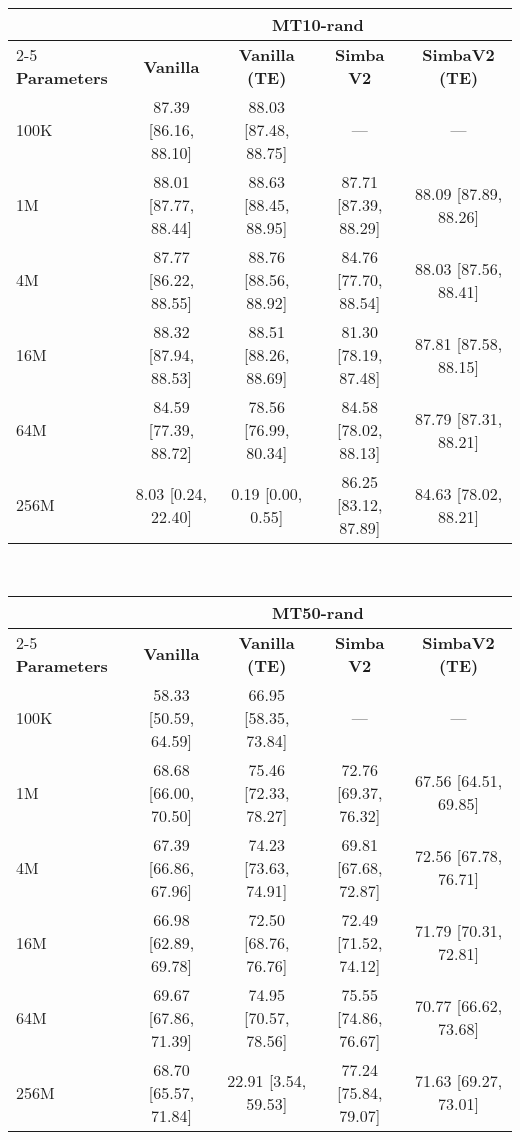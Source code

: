 \begin{table*}[t]
\centering
\caption{Success Rate (SR) with 95\% bootstrapped confidence intervals. Results are shown as Mean [Lower, Upper].}
\label{tab:parameter_scaling_results}
\begin{tabular}{lcccc}
\toprule
& \multicolumn{4}{c}{MT10-rand} \\
\cmidrule(lr){2-5}
\textbf{Parameters} & \textbf{Vanilla} & \textbf{Vanilla (TE)} & \textbf{Simba V2} & \textbf{SimbaV2 (TE)} \\
\midrule
100K & 87.39 [86.16, 88.10] & 88.03 [87.48, 88.75] & --- & --- \\
1M & 88.01 [87.77, 88.44] & 88.63 [88.45, 88.95] & 87.71 [87.39, 88.29] & 88.09 [87.89, 88.26] \\
4M & 87.77 [86.22, 88.55] & 88.76 [88.56, 88.92] & 84.76 [77.70, 88.54] & 88.03 [87.56, 88.41] \\
16M & 88.32 [87.94, 88.53] & 88.51 [88.26, 88.69] & 81.30 [78.19, 87.48] & 87.81 [87.58, 88.15] \\
64M & 84.59 [77.39, 88.72] & 78.56 [76.99, 80.34] & 84.58 [78.02, 88.13] & 87.79 [87.31, 88.21] \\
256M & 8.03 [0.24, 22.40] & 0.19 [0.00, 0.55] & 86.25 [83.12, 87.89] & 84.63 [78.02, 88.21] \\
\bottomrule
\end{tabular}
\\[1.5em]
\begin{tabular}{lcccc}
\toprule
& \multicolumn{4}{c}{MT50-rand} \\
\cmidrule(lr){2-5}
\textbf{Parameters} & \textbf{Vanilla} & \textbf{Vanilla (TE)} & \textbf{Simba V2} & \textbf{SimbaV2 (TE)} \\
\midrule
100K & 58.33 [50.59, 64.59] & 66.95 [58.35, 73.84] & --- & --- \\
1M & 68.68 [66.00, 70.50] & 75.46 [72.33, 78.27] & 72.76 [69.37, 76.32] & 67.56 [64.51, 69.85] \\
4M & 67.39 [66.86, 67.96] & 74.23 [73.63, 74.91] & 69.81 [67.68, 72.87] & 72.56 [67.78, 76.71] \\
16M & 66.98 [62.89, 69.78] & 72.50 [68.76, 76.76] & 72.49 [71.52, 74.12] & 71.79 [70.31, 72.81] \\
64M & 69.67 [67.86, 71.39] & 74.95 [70.57, 78.56] & 75.55 [74.86, 76.67] & 70.77 [66.62, 73.68] \\
256M & 68.70 [65.57, 71.84] & 22.91 [3.54, 59.53] & 77.24 [75.84, 79.07] & 71.63 [69.27, 73.01] \\
\bottomrule
\end{tabular}
\end{table*}